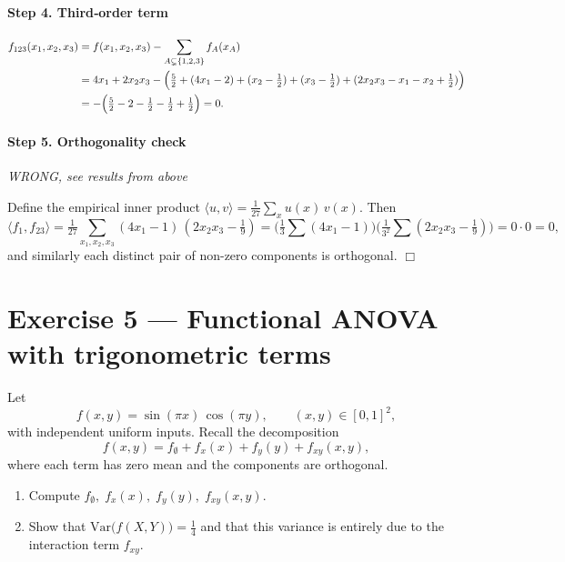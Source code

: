 \documentclass[a4paper]{article}
\begin{document}
\paragraph{Step 4. Third‐order term}
\[
\begin{split}
    f_{123}(x_1,x_2,x_3)
    & = f(x_1,x_2,x_3)
        - \sum_{A\subsetneq\{1,2,3\}} f_A(x_A) \\
    & = 4 x_1 + 2 x_2 x_3
        - \Bigl( \tfrac{5}{2} + (4 x_1 - 2) + (x_2 - \tfrac{1}{2}) + (x_3 - \tfrac{1}{2}) + ( 2 x_2 x_3 - x_1 - x_2 + \tfrac{1}{2} ) \Bigr) \\
    & = - \Bigl( \tfrac{5}{2} - 2 - \tfrac{1}{2} - \tfrac{1}{2} + \tfrac{1}{2} \Bigr)
    = 0.    
\end{split}
\]

\paragraph{Step 5. Orthogonality check}
\textit{WRONG, see results from above}

Define the empirical inner product
\(\langle u,v\rangle = \tfrac1{27}\sum_{x}u(x)\,v(x)\).  Then
\[
\langle f_1, f_{23}\rangle
=\tfrac1{27}\sum_{x_1,x_2,x_3}(4x_1-1)\,(2x_2x_3-\tfrac{1}{9})
= \bigl(\tfrac1{3}\sum(4x_1-1)\bigr)
  \bigl(\tfrac1{3^2}\sum(2x_2x_3-\tfrac19)\bigr)
=0\cdot0=0,
\]
and similarly each distinct pair of non-zero components is orthogonal.
\hfill\(\Box\)

\section*{Exercise 5 — Functional ANOVA with trigonometric terms}
\label{ex:FA_sincos_improved}

Let
\[
f(x,y)=\sin(\pi x)\,\cos(\pi y),
\qquad
(x,y)\in[0,1]^2,
\]
with independent uniform inputs.  Recall the decomposition
\[
f(x,y)=f_\emptyset + f_x(x) + f_y(y) + f_{xy}(x,y),
\]
where each term has zero mean and the components are orthogonal.

\begin{enumerate}%
  \item Compute
        \(
          f_\emptyset,\;
          f_x(x),\;
          f_y(y),\;
          f_{xy}(x,y).
        \)
  \item Show that
        \(\text{Var}\bigl(f(X,Y)\bigr)=\tfrac14\)
        and that this variance is entirely due to the interaction term
        \(f_{xy}\).
\end{enumerate}
\end{document}
